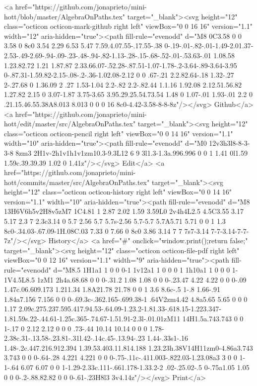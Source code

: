       <a href="https://github.com/jonaprieto/mini-hott/blob/master/AlgebraOnPaths.tex" target="_blank"><svg height="12" class="octicon octicon-mark-github right left" viewBox="0 0 16 16" version="1.1" width="12" aria-hidden="true"><path fill-rule="evenodd" d="M8 0C3.58 0 0 3.58 0 8c0 3.54 2.29 6.53 5.47 7.59.4.07.55-.17.55-.38 0-.19-.01-.82-.01-1.49-2.01.37-2.53-.49-2.69-.94-.09-.23-.48-.94-.82-1.13-.28-.15-.68-.52-.01-.53.63-.01 1.08.58 1.23.82.72 1.21 1.87.87 2.33.66.07-.52.28-.87.51-1.07-1.78-.2-3.64-.89-3.64-3.95 0-.87.31-1.59.82-2.15-.08-.2-.36-1.02.08-2.12 0 0 .67-.21 2.2.82.64-.18 1.32-.27 2-.27.68 0 1.36.09 2 .27 1.53-1.04 2.2-.82 2.2-.82.44 1.1.16 1.92.08 2.12.51.56.82 1.27.82 2.15 0 3.07-1.87 3.75-3.65 3.95.29.25.54.73.54 1.48 0 1.07-.01 1.93-.01 2.2 0 .21.15.46.55.38A8.013 8.013 0 0 0 16 8c0-4.42-3.58-8-8-8z"/></svg> Github</a>
      <a href="https://github.com/jonaprieto/mini-hott/edit/master/src/AlgebraOnPaths.tex" target="_blank"><svg height="12" class="octicon octicon-pencil right left" viewBox="0 0 14 16" version="1.1" width="10" aria-hidden="true"><path fill-rule="evenodd" d="M0 12v3h3l8-8-3-3-8 8zm3 2H1v-2h1v1h1v1zm10.3-9.3L12 6 9 3l1.3-1.3a.996.996 0 0 1 1.41 0l1.59 1.59c.39.39.39 1.02 0 1.41z"/></svg> Edit</a>
      <a href="https://github.com/jonaprieto/mini-hott/commits/master/src/AlgebraOnPaths.tex" target="_blank"><svg height="12" class="octicon octicon-history right left" viewBox="0 0 14 16" version="1.1" width="10" aria-hidden="true"><path fill-rule="evenodd" d="M8 13H6V6h5v2H8v5zM7 1C4.81 1 2.87 2.02 1.59 3.59L0 2v4h4L2.5 4.5C3.55 3.17 5.17 2.3 7 2.3c3.14 0 5.7 2.56 5.7 5.7s-2.56 5.7-5.7 5.7A5.71 5.71 0 0 1 1.3 8c0-.34.03-.67.09-1H.08C.03 7.33 0 7.66 0 8c0 3.86 3.14 7 7 7s7-3.14 7-7-3.14-7-7-7z"/></svg> History</a>
      <a  href="#" onclick="window.print();return false;" target="_blank"><svg height="12" class="octicon octicon-file-pdf right left" viewBox="0 0 12 16" version="1.1" width="9" aria-hidden="true"><path fill-rule="evenodd" d="M8.5 1H1a1 1 0 0 0-1 1v12a1 1 0 0 0 1 1h10a1 1 0 0 0 1-1V4.5L8.5 1zM1 2h4a.68.68 0 0 0-.31.2 1.08 1.08 0 0 0-.23.47 4.22 4.22 0 0 0-.09 1.47c.06.609.173 1.211.34 1.8A21.78 21.78 0 0 1 3.6 8.6c-.5 1-.8 1.66-.91 1.84a7.156 7.156 0 0 0-.69.3c-.362.165-.699.38-1 .64V2zm4.42 4.8a5.65 5.65 0 0 0 1.17 2.09c.275.237.595.417.94.53-.64.09-1.23.2-1.81.33-.618.15-1.223.347-1.81.59s.22-.44.61-1.25c.365-.74.67-1.51.91-2.3l-.01.01zM11 14H1.5a.743.743 0 0 1-.17 0 2.12 2.12 0 0 0 .73-.44 10.14 10.14 0 0 0 1.78-2.38c.31-.13.58-.23.81-.31l.42-.14c.45-.13.94-.23 1.44-.33s1-.16 1.48-.2c.447.216.912.394 1.39.53.403.11.814.188 1.23.23h.38V14H11zm0-4.86a3.743 3.743 0 0 0-.64-.28 4.221 4.221 0 0 0-.75-.11c-.411.003-.822.03-1.23.08a3 3 0 0 1-1-.64 6.07 6.07 0 0 1-1.29-2.33c.111-.661.178-1.33.2-2 .02-.25.02-.5 0-.75a1.05 1.05 0 0 0-.2-.88.82.82 0 0 0-.61-.23H8l3 3v4.14z"/></svg> Print</a>
